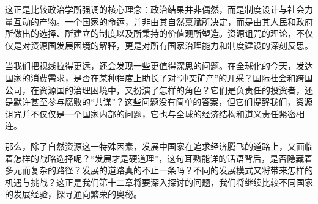 这正是比较政治学所强调的核心理念：政治结果并非偶然，而是制度设计与社会力量互动的产物。一个国家的命运，并非由其自然禀赋所决定，而是由其人民和政府所做出的选择、所建立的制度以及所秉持的价值观所塑造。资源诅咒的理论，不仅仅是对资源国发展困境的解释，更是对所有国家治理能力和制度建设的深刻反思。

当我们把视线拉得更远，还会发现一些更值得深思的问题。在全球化的今天，发达国家的消费需求，是否在某种程度上助长了对“冲突矿产”的开采？国际社会和跨国公司，在资源国的治理困境中，又扮演了怎样的角色？它们是负责任的投资者，还是默许甚至参与腐败的“共谋”？这些问题没有简单的答案，但它们提醒我们，资源诅咒并不仅仅是一个国家内部的问题，它也与全球的经济结构和道义责任紧密相连。

那么，除了自然资源这一特殊因素，发展中国家在追求经济腾飞的道路上，又面临着怎样的战略选择呢？“发展才是硬道理”，这句耳熟能详的话语背后，是否隐藏着多元而复杂的路径？发展的道路真的不止一条吗？不同的发展模式又将带来怎样的机遇与挑战？这正是我们第十二章将要深入探讨的问题，我们将继续比较不同国家的发展经验，探寻通向繁荣的奥秘。